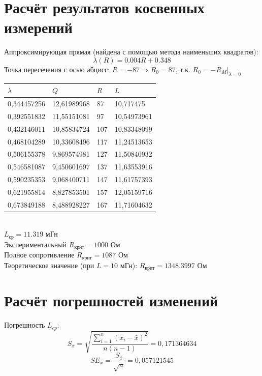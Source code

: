\documentclass[14pt]{extarticle}
\begin{document}
    \section{Расчёт результатов косвенных измерений}
    Аппроксимирующая прямая (найдена с помощью метода наименьших квадратов):
    \begin{equation*}
        \lambda(R) = 0.004R + 0.348
    \end{equation*}
    Точка пересечения с осью абцисс: $R = -87 \Rightarrow R_0 = 87$, т.к. $R_0 = -R_M|_{\lambda = 0}$
    \begin{tabularx}{\textwidth}{|X|X|X|X|}
        \hline
        $\lambda$ & $Q$ & $R$ & $L$ \\\hline
        0,344457256 & 12,61989968 & 87  & 10,717475   \\\hline
        0,392551832 & 11,55151081 & 97  & 10,54973961 \\\hline
        0,432146011 & 10,85834724 & 107  & 10,83348099 \\\hline
        0,468104289 & 10,33608496 & 117 & 11,24513653 \\\hline
        0,506155378 & 9,869574981 & 127 & 11,50840932 \\\hline
        0,546581087 & 9,450601697 & 137 & 11,63553916 \\\hline
        0,590235353 & 9,068400711 & 147 & 11,61757393 \\\hline
        0,621955814 & 8,827853501 & 157 & 12,05159716 \\\hline
        0,673849188 & 8,488928227 & 167 & 11,71604632 \\\hline
    \end{tabularx}
    \vspace*{3mm}\\
    $L_{\text{ср}} = 11.319$ мГн\\
    Экспериментальный $R_{\text{крит}} = 1000$ Ом \\
    Полное сопротивление $R_{\text{крит}} = 1087$ Ом \\
    Теоретическое значение (при $L = 10$ мГн): $R_{\text{крит}} = 1348.3997$ Ом \\

    \section{Расчёт погрешностей изменений}
    Погрешность $L_{cp}$:
    \begin{equation*}
        S_{\bar{x}} = \sqrt{\frac{ \sum_{i = 1}^{n} (x_i - \bar{x})^2 }{n(n - 1)}} = 0,171364634
    \end{equation*}
    \begin{equation*}
        SE_{\bar{x}} = \frac{S_{\bar{x}}}{\sqrt{n}} = 0,057121545
    \end{equation*}
    
\end{document}
